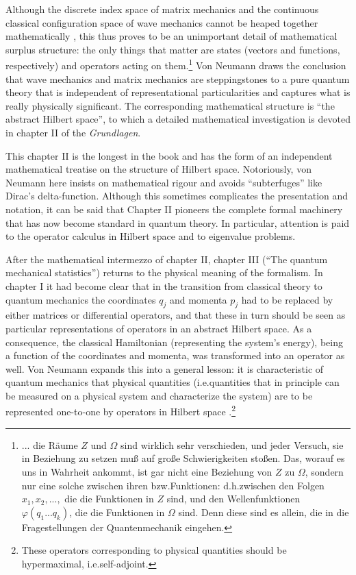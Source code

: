 \documentclass[11pt]{article}
\begin{document}
Although the discrete index space of matrix mechanics and the continuous classical configuration space of wave mechanics cannot be heaped together mathematically \cite[p.\@ 15]{VN1}, this thus proves to be an unimportant detail of mathematical surplus structure: the only things that matter are states (vectors and functions, respectively) and operators acting on them.\footnote{... die R\"{a}ume $Z$ und $\Omega$ sind wirklich sehr verschieden, und jeder Versuch, sie in Beziehung zu setzen mu{\ss} auf gro{\ss}e Schwierigkeiten sto{\ss}en. Das, worauf es uns in Wahrheit ankommt, ist gar nicht eine Beziehung von $Z$ zu $\Omega$, sondern nur eine solche zwischen ihren bzw.\@ Funktionen: d.h.\@ zwischen den Folgen $x_1, x_2, ..., $ die die Funktionen in $Z$ sind, und den Wellenfunktionen $\varphi(q_1... q_k)$, die die Funktionen in $\Omega$ sind. Denn diese sind es allein, die in die Fragestellungen der Quantenmechanik eingehen.}
Von Neumann draws the conclusion that wave mechanics and matrix mechanics are steppingstones to a pure quantum theory that is independent of  representational particularities and captures what is really physically significant. The corresponding mathematical structure is ``the abstract Hilbert space'', to which a detailed mathematical investigation is devoted in chapter II of the \emph{Grundlagen}.

This chapter II is the longest in the book and has the form of an independent mathematical treatise on the structure of Hilbert space. Notoriously, von Neumann here insists on mathematical rigour and avoids ``subterfuges'' like Dirac's delta-function. Although this sometimes complicates the presentation and notation, it can be said that Chapter II pioneers the complete formal machinery that has now become standard in quantum theory. In particular, attention is paid to the operator calculus in Hilbert space and to eigenvalue problems.

After the mathematical intermezzo of chapter II, chapter III (``The quantum mechanical statistics'') returns to the physical meaning of the formalism. In chapter I it had become clear that in the transition from classical theory to quantum mechanics the coordinates $q_j$ and momenta $p_j$ had to be replaced by either matrices or differential operators, and that these in turn should be seen as particular representations of  operators in an abstract Hilbert space. As a consequence, the classical Hamiltonian (representing the system's energy), being a function of the coordinates and momenta, was transformed into an operator as well. Von Neumann expands this into a general lesson: it is characteristic of quantum mechanics that physical quantities (i.e.\@ quantities that in principle can be measured on a physical system and characterize the system) are to be represented one-to-one by operators in Hilbert space \cite[sect.\@ III.1 and especially sect.\@ III.5]{VN1}.\footnote{These operators corresponding to physical quantities should be hypermaximal, i.e.\@ self-adjoint.}
\end{document}
